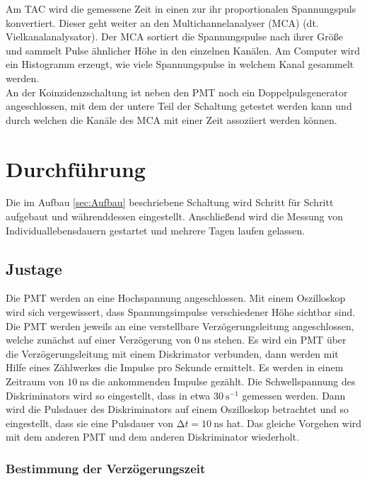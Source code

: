 Am TAC wird die gemessene Zeit in einen zur ihr proportionalen Spannungspuls konvertiert. Dieser geht weiter an den Multichannelanalyser (MCA) (dt. Vielkanalanalysator). Der MCA sortiert die Spannungspulse 
nach ihrer Größe und sammelt Pulse ähnlicher Höhe in den einzelnen Kanälen. Am Computer wird ein Histogramm erzeugt, wie viele Spannungspulse in welchem Kanal gesammelt werden.\\
An der Koinzidenzschaltung ist neben den PMT noch ein Doppelpulsgenerator angeschlossen, mit dem der untere Teil der Schaltung getestet werden kann und durch welchen die Kanäle 
des MCA mit einer Zeit assoziiert werden können. 

\section{Durchführung}
\label{sec:Durchführung}

\noindent Die im Aufbau \ref{sec:Aufbau} beschriebene Schaltung wird Schritt für Schritt aufgebaut und währenddessen eingestellt. Anschließend wird die Messung von Individuallebensdauern gestartet
und mehrere Tagen laufen gelassen. \\

    \subsection{Justage}

    \noindent Die PMT werden an eine Hochspannung angeschlossen. Mit einem Oszilloskop wird sich vergewissert, dass Spannungsimpulse verschiedener Höhe sichtbar sind. 
    Die PMT werden jeweils an eine verstellbare Verzögerungsleitung angeschlossen, welche zunächst auf einer Verzögerung von $\SI{0}{\nano\second}$ stehen. Es wird ein PMT über die Verzögerungsleitung 
    mit einem Diskrimator verbunden, dann werden mit Hilfe eines Zählwerkes die Impulse pro Sekunde ermittelt. Es werden in einem Zeitraum von $\SI{10}{\nano\second}$ die ankommenden Impulse 
    gezählt. Die Schwellspannung des Diskriminators wird so eingestellt, dass in etwa $\SI{30}{\second\tothe{-1}}$ gemessen werden. Dann wird die Pulsdauer des Diskriminators auf einem 
    Oszilloskop betrachtet und so eingestellt, dass sie eine Pulsdauer von $\increment t = \SI{10}{\nano\second}$ hat. Das gleiche Vorgehen wird mit dem anderen PMT und dem anderen 
    Diskriminator wiederholt. 

        \subsubsection{Bestimmung der Verzögerungszeit}

